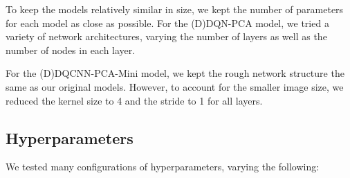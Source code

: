 \documentclass[11pt]{article}
\begin{document}
To keep the models relatively similar in size, we kept the number of parameters for each model as close as possible. For the (D)DQN-PCA model, we tried a variety of network architectures, varying the number of layers as well as the number of nodes in each layer. 

For the (D)DQCNN-PCA-Mini model, we kept the rough network structure the same as our original models. However, to account for the smaller image size, we reduced the kernel size to 4 and the stride to 1 for all layers.

\subsection{Hyperparameters}

We tested many configurations of hyperparameters, varying the following: 
\end{document}
